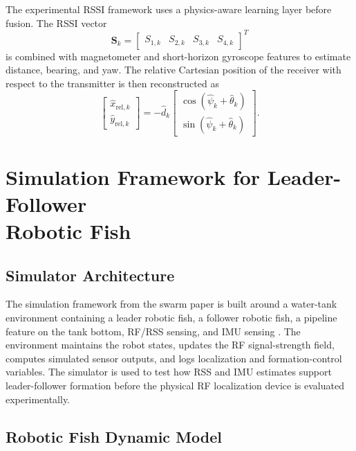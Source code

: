 \documentclass{uhcoethesis}
\begin{document}
The experimental RSSI framework uses a physics-aware learning layer before fusion. The RSSI vector
\begin{equation}
    \mathbf{S}_k =
    \begin{bmatrix}
    S_{1,k} & S_{2,k} & S_{3,k} & S_{4,k}
    \end{bmatrix}^{T}
    \label{eq:ch5_rssi_vector}
\end{equation}
is combined with magnetometer and short-horizon gyroscope features to estimate distance, bearing, and yaw. The relative Cartesian position of the receiver with respect to the transmitter is then reconstructed as
\begin{equation}
    \begin{bmatrix}
    \hat{x}_{\mathrm{rel},k}\\
    \hat{y}_{\mathrm{rel},k}
    \end{bmatrix}
    =
    -\hat{d}_k
    \begin{bmatrix}
    \cos(\hat{\psi}_k+\hat{\theta}_k)\\
    \sin(\hat{\psi}_k+\hat{\theta}_k)
    \end{bmatrix}.
    \label{eq:ch5_relative_position}
\end{equation}

\section[Simulation Framework for Leader-Follower Robotic Fish]{Simulation Framework for Leader-Follower\\ Robotic Fish}

\subsection{Simulator Architecture}

The simulation framework from the swarm paper is built around a water-tank environment containing a leader robotic fish, a follower robotic fish, a pipeline feature on the tank bottom, RF/RSS sensing, and IMU sensing \cite{Masood2025Swarm}. The environment maintains the robot states, updates the RF signal-strength field, computes simulated sensor outputs, and logs localization and formation-control variables. The simulator is used to test how RSS and IMU estimates support leader-follower formation before the physical RF localization device is evaluated experimentally.

\subsection{Robotic Fish Dynamic Model}
\end{document}

